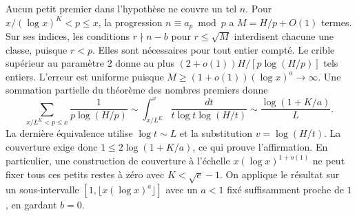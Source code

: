 \documentclass[11pt,a4paper]{article}
\begin{document}
Aucun petit premier dans l'hypothèse ne couvre un tel $n$. Pour
$x/(\log x)^K<p\le x$, la progression $n\equiv a_p\bmod p$
a $M=H/p+O(1)$ termes. Sur ses indices, les conditions
$r\nmid n-b$ pour $r\le\sqrt M$ interdisent chacune une classe,
puisque $r<p$. Elles sont nécessaires pour tout entier compté.
Le crible supérieur au paramètre $2$ donne au plus
$(2+o(1))H/[p\log(H/p)]$ tels entiers. L'erreur est uniforme puisque
$M\ge (1+o(1))(\log x)^a\to\infty$. Une sommation partielle du théorème
des nombres premiers donne
\[
 \sum_{x/L^K<p\le x}\frac1{p\log(H/p)}
 \sim \int_{x/L^K}^x\frac{dt}{t\log t\log(H/t)}
 \sim \frac{\log(1+K/a)}{L}.
\]
La dernière équivalence utilise $\log t\sim L$ et la substitution
$v=\log(H/t)$. La couverture exige donc
$1\le 2\log(1+K/a)$, ce qui prouve l'affirmation.
En particulier, une construction de couverture à l'échelle
$x(\log x)^{1+o(1)}$ ne peut fixer tous ces petits restes à zéro
avec $K<\sqrt e-1$. On applique le résultat sur un sous-intervalle
$[1,\lfloor x(\log x)^a\rfloor]$ avec un $a<1$ fixé suffisamment
proche de $1$, en gardant $b=0$.
\end{document}
